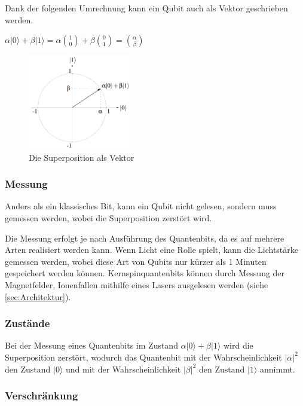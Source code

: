 Dank der folgenden Umrechnung kann ein Qubit auch als Vektor geschrieben werden.

$\alpha|0\rangle + \beta|1\rangle = \alpha\binom{1}{0} + \beta\binom{0}{1} = \binom{\alpha}{\beta}$

\begin{figure}[!htb]
	\centering\includegraphics[width=0.4\textwidth]{images/vektor.jpg}
	\caption{Die Superposition als Vektor}
	\label{vektor}
\end{figure}


\subsubsection{Messung}
\label{sec:Messung}

Anders als ein klassisches Bit, kann ein Qubit nicht gelesen, sondern muss gemessen werden, wobei die Superposition zerstört wird.

Die Messung erfolgt je nach Ausführung des Quantenbits, da es auf mehrere Arten realisiert werden kann. Wenn Licht eine Rolle spielt, kann die Lichtstärke gemessen werden, wobei diese Art von Qubits nur kürzer als 1 Minuten gespeichert werden können. Kernspinquantenbits können durch Messung der Magnetfelder, Ionenfallen mithilfe eines Lasers ausgelesen werden (siehe \ref{sec:Architektur}).


\subsubsection{Zustände}
\label{sec:Zustaende}

Bei der Messung eines Quantenbits im Zustand $\alpha|0\rangle+\beta|1\rangle$ wird die Superposition zerstört, wodurch das Quantenbit mit der Wahrscheinlichkeit $|\alpha|^2$ den Zustand $|0\rangle$ und mit der Wahrscheinlichkeit $|\beta|^2$ den Zustand $|1\rangle$ annimmt.


\subsubsection{Verschränkung}
\label{sec:Verschraenkung}

